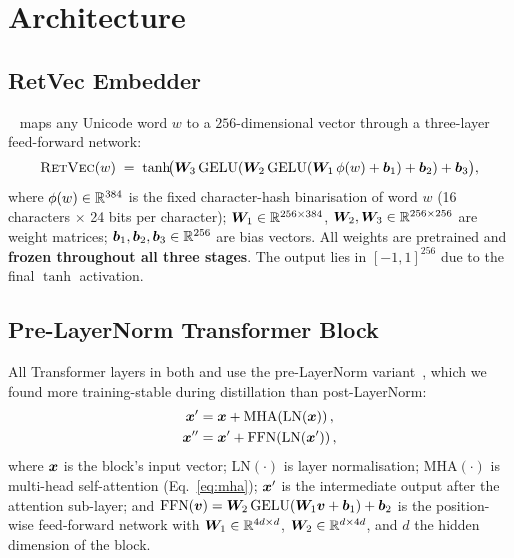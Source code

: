 \section{Architecture}
\label{sec:arch}

\subsection{RetVec Embedder}

\RetVec{}~\citep{sander2023retvec} maps any Unicode word $w$ to a
$256$-dimensional vector through a three-layer feed-forward network:
\begin{equation}
  \textsc{RetVec}(w)
  \;=\;
  \tanh\!\bigl(
    \bm{W}_3\,\text{GELU}(
      \bm{W}_2\,\text{GELU}(
        \bm{W}_1\,\phi(w) + \bm{b}_1
      ) + \bm{b}_2
    ) + \bm{b}_3
  \bigr),
  \label{eq:retvec}
\end{equation}
\noindent where $\phi(w) \in \mathbb{R}^{384}$ is the fixed character-hash binarisation of word $w$ (16 characters $\times$ 24 bits per character); $\bm{W}_1 \in \mathbb{R}^{256 \times 384}$, $\bm{W}_2, \bm{W}_3 \in \mathbb{R}^{256 \times 256}$ are weight matrices; $\bm{b}_1, \bm{b}_2, \bm{b}_3 \in \mathbb{R}^{256}$ are bias vectors. All weights are pretrained and \textbf{frozen throughout all three stages}. The output lies in $[-1, 1]^{256}$ due to the final $\tanh$ activation.

\subsection{Pre-LayerNorm Transformer Block}

All Transformer layers in both \RetBERT{} and \LightRet{} use the
pre-LayerNorm variant~\citep{xiong2020layer}, which we found more training-stable
during distillation than post-LayerNorm:
\begin{align}
  \bm{x}' &= \bm{x} + \text{MHA}\!\left(\text{LN}(\bm{x})\right),
  \label{eq:pre_ln_attn}\\
  \bm{x}'' &= \bm{x}' + \text{FFN}\!\left(\text{LN}(\bm{x}')\right),
  \label{eq:pre_ln_ffn}
\end{align}
\noindent where $\bm{x}$ is the block's input vector; $\text{LN}(\cdot)$ is layer normalisation; $\text{MHA}(\cdot)$ is multi-head self-attention (Eq.~\ref{eq:mha}); $\bm{x}'$ is the intermediate output after the attention sub-layer; and $\text{FFN}(\bm{v}) = \bm{W}_2\,\text{GELU}(\bm{W}_1\bm{v} + \bm{b}_1) + \bm{b}_2$ is the position-wise feed-forward network with $\bm{W}_1 \in \mathbb{R}^{4d \times d}$, $\bm{W}_2 \in \mathbb{R}^{d \times 4d}$, and $d$ the hidden dimension of the block.

